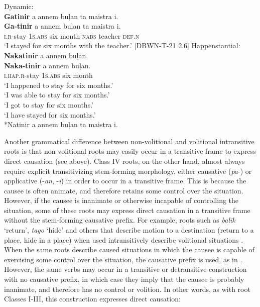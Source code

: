 \ea
Dynamic: \\
\textbf{Gatinir}  a  annem  buļan  ta  maistra  i. \\\smallskip
\gll \textbf{Ga-tinir}  a  annem  buļan  ta  maistra  i. \\
\textsc{i.r}-stay  1\textsc{s.abs}  six  month  \textsc{nabs}  teacher  \textsc{def.n} \\
\glt ‘I stayed for six months with the teacher.’ [DBWN-T-21 2.6]
\z
\ea
Happenstantial: \\
\textbf{Nakatinir}  a  annem  buļan. \\\smallskip
\gll \textbf{Naka-tinir}  a  annem  buļan. \\
\textsc{i.hap.r}-stay  1\textsc{s.abs}  six  month \\
\glt ‘I happened to stay for six months.’ \\
  ‘I was able to stay for six months.’ \\
  ‘I got to stay for six months.’ \\
  ‘I have stayed for six months.’ \\\smallskip
*Natinir a annem buļan ta maistra i.
\z

Another grammatical difference between non-volitional and volitional intransitive roots is that non-volitional roots may easily occur in a transitive frame to express direct causation (see  above). Class IV roots, on the other hand, almost always require explicit transitivizing stem-forming morphology, either causative (\textit{pa}{}-) or applicative (-\textit{an}, -\textit{i}) in order to occur in a transitive frame. This is because the causee is often animate, and therefore retains some control over the situation. However, if the causee is inanimate or otherwise incapable of controlling the situation, some of these roots may express direct causation in a transitive frame without the stem-forming causative prefix. For example, roots such as \textit{balik} ‘return’, \textit{tago} ‘hide’ and others that describe motion to a destination (return to a place, hide in a place) when used intransitively describe volitional situations . When the same roots describe caused situations in which the causee is capable of exercising some control over the situation, the causative prefix is used, as in . However, the same verbs may occur in a transitive  or detransitive  construction with no causative prefix, in which case they imply that the causee is probably inanimate, and therefore has no control or volition. In other words, as with root Classes I-III, this construction expresses direct causation:

